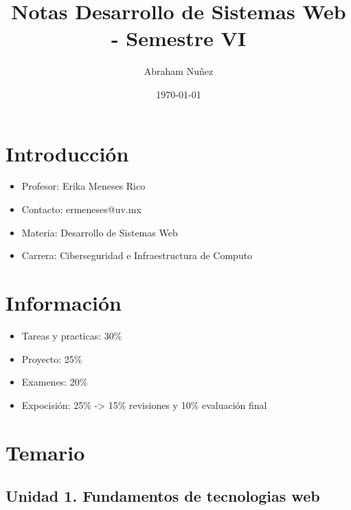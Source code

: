 \documentclass[11pt]{article}
\author{Abraham Nuñez}
\date{\today}
\title{Notas Desarrollo de Sistemas Web - Semestre VI}
\begin{document}
\maketitle
\tableofcontents

\section{Introducción}
\label{sec:orgfa2bf28}
\begin{itemize}
\item Profesor: Erika Meneses Rico
\item Contacto: ermeneses@uv.mx
\item Materia: Desarrollo de Sistemas Web
\item Carrera: Ciberseguridad e Infraestructura de Computo
\end{itemize}
\section{Información}
\label{sec:orga89a0cc}
\begin{itemize}
\item Tareas y practicas: 30\%
\item Proyecto: 25\%
\item Examenes: 20\%
\item Expocisión: 25\% -> 15\% revisiones y 10\% evaluación final
\end{itemize}
\section{Temario}
\label{sec:orgb9c7efa}
\subsection{Unidad 1. Fundamentos de tecnologias web}
\label{sec:orgb9a48ee}
\end{document}
